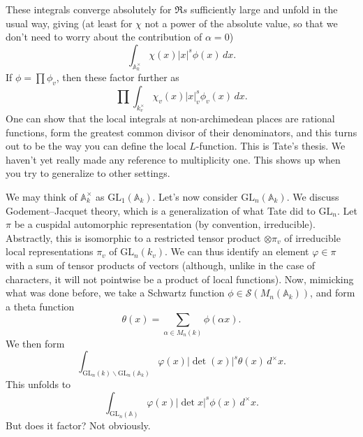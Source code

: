 \documentclass[reqno]{amsart} 
\begin{document}
These integrals converge absolutely for $\Re s$ sufficiently large and unfold in the usual way, giving
(at least for $\chi$ not a power of the absolute value, so that we don't need to worry about the contribution of $\alpha = 0$)
\begin{equation*}
  \int_{\mathbb{A}_k^\times} \chi(x) \lvert x \rvert^s \phi(x) \, d x.
\end{equation*}
If $\phi = \prod \phi_v$, then these factor further as
\begin{equation}\label{eq:cq6r32qpe5}
  \prod \int_{k_v^\times} \chi_v(x) \lvert x \rvert_v^s \phi_v(x) \, d x.
\end{equation}
One can show that the local integrals at non-archimedean places are rational functions, form the greatest common divisor of their denominators, and this turns out to be the way you can define the local $L$-function.  This is Tate's thesis.  We haven't yet really made any reference to multiplicity one.  This shows up when you try to generalize to other settings.

We may think of $\mathbb{A}_k^\times$ as $\mathrm{GL}_1(\mathbb{A}_k)$.  Let's now consider $\mathrm{GL}_n(\mathbb{A}_k)$.  We discuss Godement--Jacquet theory, which is a generalization of what Tate did to $\mathrm{GL}_n$.  Let $\pi$ be a cuspidal automorphic representation (by convention, irreducible).  Abstractly, this is isomorphic to a restricted tensor product $\otimes \pi_v$ of irreducible local representations $\pi_v$ of $\mathrm{GL}_n(k_v)$.  We can thus identify an element $\varphi \in \pi$ with a sum of tensor products of vectors (although, unlike in the case of characters, it will not pointwise be a product of local functions).  Now, mimicking what was done before, we take a Schwartz function $\phi \in \mathcal{S}(M_n(\mathbb{A}_k))$, and form a theta function
\begin{equation*}
  \theta(x)
  =
  \sum_{\alpha \in M_n(k)}
  \phi(\alpha x).
\end{equation*}
We then form
\begin{equation*}
  \int_{\mathrm{GL}_n(k) \backslash \mathrm{GL}_n(\mathbb{A}_k)}
  \varphi(x) \lvert \det(x) \rvert^s \theta(x) \,d^\times x.
\end{equation*}
This unfolds to
\begin{equation*}
  \int_{\mathrm{GL}_n(\mathbb{A})} \varphi(x) \lvert \det x \rvert^s \phi(x) \, d^\times x.
\end{equation*}
But does it factor?  Not obviously.
\end{document}
